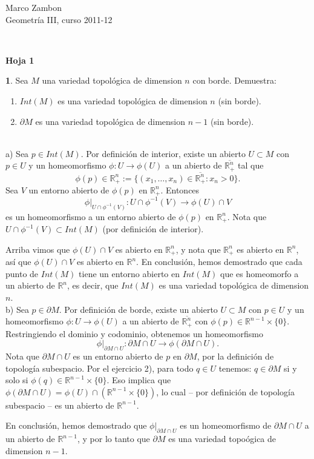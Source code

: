 \documentclass[12pt,a4paper]{report}
\theoremstyle{definition}
\newtheorem{ex}{}
\newcommand{\RR}{\ensuremath{\mathbb R}}
\begin{document}
\noindent
{\sffamily\large Marco Zambon 
\hfill   \\Geometr\'ia III, curso 2011-12}
 

\noindent
\hrulefill{}\\
\begin{center}\bfseries\large\textsf{Hoja 1    \vspace{-2mm}}
\end{center}

\noindent

 

 \begin{ex}Sea $M$ una variedad topol\'ogica de dimension $n$ con borde. Demuestra:
\begin{enumerate}
\item $Int(M)$ es una variedad topol\'ogica de dimension $n$ (sin borde).
\item $\partial M$ es una variedad topol\'ogica de dimension $n-1$ (sin borde).
\end{enumerate}
\end{ex}

\\

a)  
Sea $p\in Int(M)$. Por definici\'on de interior,  existe un abierto $U\subset M$ con $p\in U$ y un homeomorfismo $\phi \colon U\to \phi(U)$ a un abierto de $\overline{\RR^n_+}$ tal que $$
\phi(p)\in \RR^n_+:=\{(x_1,\dots,x_n)\in\overline{\RR^n_+}:x_n>0\}.$$
Sea $V$ un entorno abierto  de $\phi(p)$ en $\RR^n_+$. Entonces $$\phi|_{U \cap \phi^{-1}(V)}\colon U \cap \phi^{-1}(V) \to \phi(U)\cap V$$ es un homeomorfismo a 
un entorno abierto de $\phi(p)$ en $\RR^n_+$. Nota que    $U \cap \phi^{-1}(V)\subset Int(M)$ (por definici\'on de interior).

 
Arriba vimos que $\phi(U)\cap V$ es abierto en $\RR^n_+$, y nota que $\RR^n_+$ es abierto en $\RR^n$, as\'i que
$\phi(U)\cap V$ es abierto en $\RR^n$.
En conclusi\'on, hemos demostrado que cada punto de $Int(M)$ tiene un entorno abierto en $Int(M)$ que es homeomorfo a un abierto de $\RR^n$, es decir, que $Int(M)$ es una variedad topol\'ogica de dimension $n$.\\

b) Sea $p\in \partial M$.  Por definici\'on de borde,  existe un abierto $U\subset M$ con $p\in U$ y un homeomorfismo  $\phi \colon U\to \phi(U)$ a un abierto de $\overline{\RR^n_+}$  con $\phi(p)\in \RR^{n-1}\times \{0\}$. Restringiendo el dominio y codominio, obtenemos un homeomorfismo $$\phi|_{\partial M \cap U} \colon \partial M \cap U \to \phi(\partial M \cap U).$$ Nota que $\partial M \cap U$ es un entorno abierto de $p$ en $\partial M$, por la definici\'on de topolog\'ia subespacio. Por el ejercicio 2), para todo $q\in U$ tenemos: $q\in \partial M$ si y solo si $\phi(q)\in \RR^{n-1}\times \{0\}$.
Eso implica que $\phi(\partial M \cap U)=\phi(U)\cap (\RR^{n-1}\times \{0\})$, lo cual -- por definici\'on de topolog\'ia subespacio -- 
es un abierto de $\RR^{n-1}$.

En conclusi\'on, hemos demostrado que $\phi|_{\partial M \cap U}$
es un homeomorfismo de ${\partial M \cap U}$ a un abierto de $\RR^{n-1}$, y por lo tanto que $\partial M$ es una variedad topo\'ogica de dimension $n-1$.
 
\end{document}
